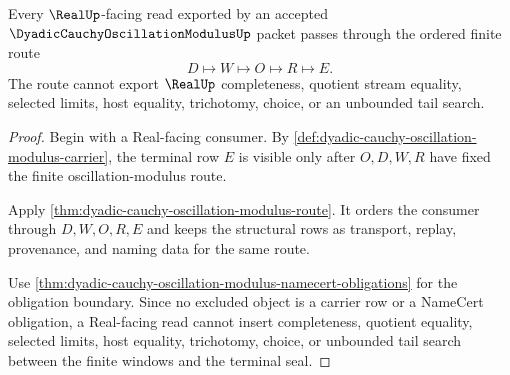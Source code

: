 \begin{theorem}
\label{thm:dyadic-cauchy-oscillation-modulus-real-seal-route}
Every $\RealUp$-facing read exported by an accepted $\DyadicCauchyOscillationModulusUp$ packet passes through the ordered finite route
$$
D\longmapsto W\longmapsto O\longmapsto R\longmapsto E.
$$
The route cannot export $\RealUp$ completeness, quotient stream equality, selected limits, host equality, trichotomy, choice, or an unbounded tail search.
\end{theorem}
\begin{proof}
Begin with a Real-facing consumer. By \autoref{def:dyadic-cauchy-oscillation-modulus-carrier}, the terminal row $E$ is visible only after $O,D,W,R$ have fixed the finite oscillation-modulus route.

Apply \autoref{thm:dyadic-cauchy-oscillation-modulus-route}. It orders the consumer through $D,W,O,R,E$ and keeps the structural rows as transport, replay, provenance, and naming data for the same route.

Use \autoref{thm:dyadic-cauchy-oscillation-modulus-namecert-obligations} for the obligation boundary. Since no excluded object is a carrier row or a NameCert obligation, a Real-facing read cannot insert completeness, quotient equality, selected limits, host equality, trichotomy, choice, or unbounded tail search between the finite windows and the terminal seal.
\end{proof}




